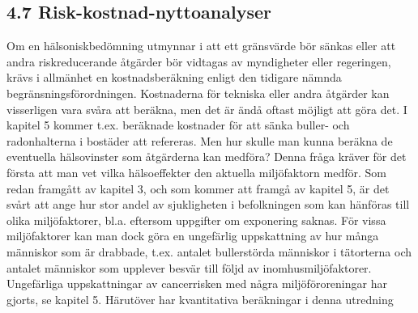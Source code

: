 \subsection*{4.7 Risk-kostnad-nyttoanalyser}
Om en hälsoniskbedömning utmynnar i att ett gränsvärde bör sänkas eller att andra riskreducerande åtgärder bör vidtagas av myndigheter eller regeringen, krävs i allmänhet en kostnadsberäkning enligt den tidigare nämnda begränsningsförordningen. Kostnaderna för tekniska eller andra åtgärder kan visserligen vara svåra att beräkna, men det är ändå oftast möjligt att göra det. I kapitel 5 kommer t.ex. beräknade kostnader för att sänka buller- och radonhalterna i bostäder att refereras. Men hur skulle man kunna beräkna de eventuella hälsovinster som åtgärderna kan medföra?
Denna fråga kräver för det första att man vet vilka hälsoeffekter den aktuella miljöfaktorn medför. Som redan framgått av kapitel 3, och som kommer att framgå av kapitel 5, är det svårt att ange hur stor andel av sjukligheten i befolkningen som kan hänföras till olika miljöfaktorer, bl.a. eftersom uppgifter om exponering saknas. För vissa miljöfaktorer kan man dock göra en ungefärlig uppskattning av hur många människor som är drabbade, t.ex. antalet bullerstörda människor i tätorterna och antalet människor som upplever besvär till följd av inomhusmiljöfaktorer. Ungefärliga uppskattningar av cancerrisken med några miljöföroreningar har gjorts, se kapitel 5. Härutöver har kvantitativa beräkningar i denna utredning

